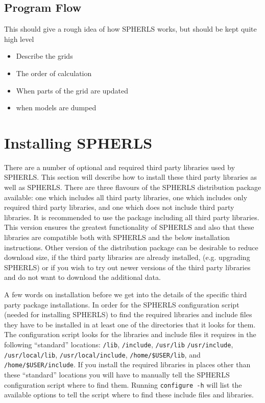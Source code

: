 \documentclass[12pt,a4paper]{book}
\begin{document}
\section{Program Flow}
This should give a rough idea of how SPHERLS works, but should be kept quite high level
\begin{itemize}
\item Describe the grids
\item The order of calculation
\item When parts of the grid are updated
\item when models are dumped
\end{itemize}

\chapter{Installing SPHERLS}

There are a number of optional and required third party libraries used by SPHERLS. This section will describe how to install these third party libraries as well as SPHERLS. There are three flavours of the SPHERLS distribution package available: one which includes all third party libraries, one which includes only required third party libraries, and one which does not include third party libraries. It is recommended to use the package including all third party libraries. This version ensures the greatest functionality of SPHERLS and also that these libraries are compatible both with SPHERLS and the below installation instructions. Other version of the distribution package can be desirable to reduce download size, if the third party libraries are already installed, (e.g. upgrading SPHERLS) or if you wish to try out newer versions of the third party libraries and do not want to download the additional data.

A few words on installation before we get into the details of the specific third party package installations. In order for the SPHERLS configuration script (needed for installing SPHERLS) to find the required libraries and include files they have to be installed in at least one of the directories that it looks for them. The configuration script looks for the libraries and include files it requires in the following ``standard'' locations: {\tt /lib}, {\tt /include}, {\tt /usr/\-lib} {\tt /usr/\-include}, {\tt /usr/local/lib}, {\tt /usr/\-local/\-include}, {\tt /home/\-\$USER/\-lib}, and {\tt /home/\-\$USER/\-include}. If you install the required libraries in places other than these ``standard'' locations you will have to manually tell the SPHERLS configuration script where to find them. Running {\tt configure -h} will list the available options to tell the script where to find these include files and libraries.
\end{document}
